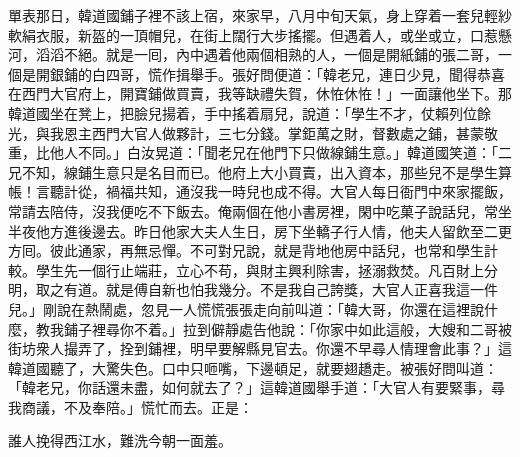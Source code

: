 單表那日，韓道國鋪子裡不該上宿，來家早，八月中旬天氣，身上穿着一套兒輕紗軟絹衣服，新盔的一頂帽兒，在街上闊行大步搖擺。但遇着人，或坐或立，口惹懸河，滔滔不絕。就是一囘，內中遇着他兩個相熟的人，一個是開紙鋪的張二哥，一個是開銀鋪的白四哥，慌作揖舉手。張好問便道：「韓老兄，連日少見，聞得恭喜在西門大官府上，開寶鋪做買賣，我等缺禮失賀，休恠休恠！」一面讓他坐下。那韓道國坐在凳上，把臉兒揚着，手中搖着扇兒，說道：「學生不才，仗賴列位餘光，與我恩主西門大官人做夥計，三七分錢。掌鉅萬之財，督數處之鋪，甚蒙敬重，比他人不同。」白汝晃道：「聞老兄在他門下只做線鋪生意。」韓道國笑道：「二兄不知，線鋪生意只是名目而已。他府上大小買賣，出入資本，那些兒不是學生算帳！言聽計從，禍福共知，通沒我一時兒也成不得。大官人每日衙門中來家擺飯，常請去陪侍，沒我便吃不下飯去。俺兩個在他小書房裡，閑中吃菓子說話兒，常坐半夜他方進後邊去。昨日他家大夫人生日，房下坐轎子行人情，他夫人留飲至二更方囘。彼此通家，再無忌憚。不可對兄說，就是背地他房中話兒，也常和學生計較。學生先一個行止端莊，立心不苟，與財主興利除害，拯溺救焚。凡百財上分明，取之有道。就是傅自新也怕我幾分。不是我自己誇獎，大官人正喜我這一件兒。」剛說在熱鬧處，忽見一人慌慌張張走向前叫道：「韓大哥，你還在這裡說什麼，教我鋪子裡尋你不着。」{}拉到僻靜處告他說：「你家中如此這般，大嫂和二哥被街坊衆人撮弄了，拴到鋪裡，明早要解縣見官去。你還不早尋人情理會此事？」這韓道國聽了，大驚失色。口中只咂嘴，下邊頓足，就要翅趫走。被張好問叫道：「韓老兄，你話還未盡，如何就去了？」這韓道國舉手道：「大官人有要緊事，尋我商議，不及奉陪。」慌忙而去。正是：

\begin{myquote} 
誰人挽得西江水，難洗今朝一面羞。
\end{myquote} 

